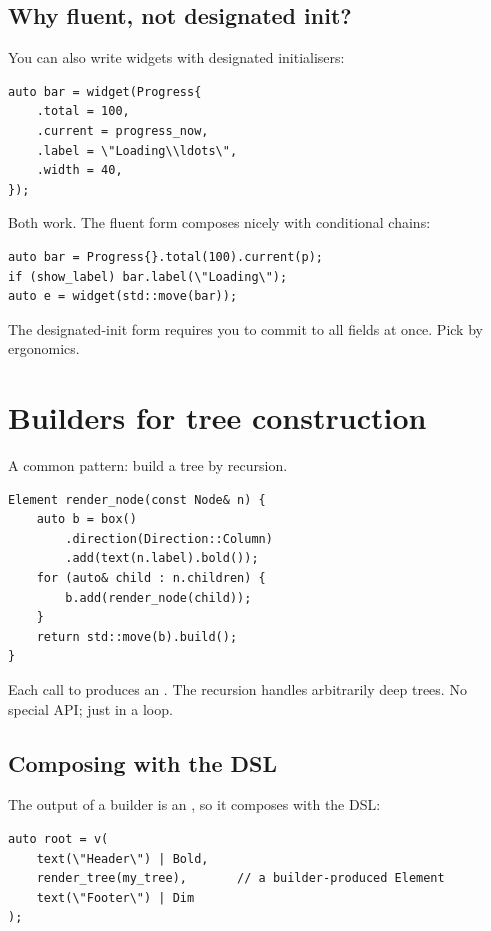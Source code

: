\subsection*{Why fluent, not designated init?}

You can also write widgets with designated initialisers:

\begin{lstlisting}
auto bar = widget(Progress{
    .total = 100,
    .current = progress_now,
    .label = \"Loading\\ldots\",
    .width = 40,
});
\end{lstlisting}

Both work. The fluent form composes nicely with conditional
chains:

\begin{lstlisting}
auto bar = Progress{}.total(100).current(p);
if (show_label) bar.label(\"Loading\");
auto e = widget(std::move(bar));
\end{lstlisting}

The designated-init form requires you to commit to all fields at
once. Pick by ergonomics.

\section{Builders for tree construction}

A common pattern: build a tree by recursion.

\begin{lstlisting}
Element render_node(const Node& n) {
    auto b = box()
        .direction(Direction::Column)
        .add(text(n.label).bold());
    for (auto& child : n.children) {
        b.add(render_node(child));
    }
    return std::move(b).build();
}
\end{lstlisting}

Each call to  produces an . The
recursion handles arbitrarily deep trees. No special API; just
 in a loop.

\subsection*{Composing with the DSL}

The output of a builder is an , so it composes with
the DSL:

\begin{lstlisting}
auto root = v(
    text(\"Header\") | Bold,
    render_tree(my_tree),       // a builder-produced Element
    text(\"Footer\") | Dim
);
\end{lstlisting}

